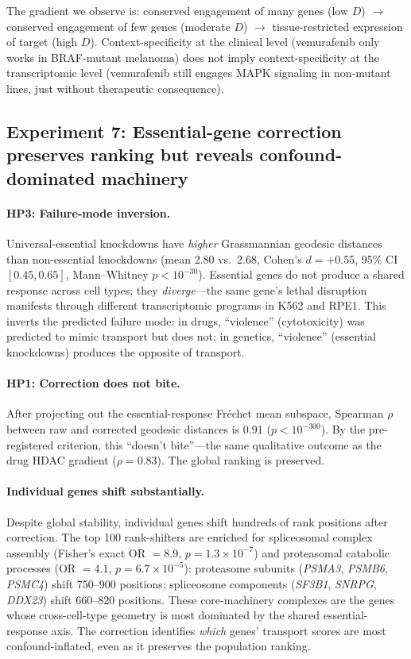 \documentclass{article}
\begin{document}
The gradient we observe is: conserved engagement of many genes (low $D$)
$\to$ conserved engagement of few genes (moderate $D$) $\to$ tissue-restricted
expression of target (high $D$). Context-specificity at the clinical level
(vemurafenib only works in BRAF-mutant melanoma) does not imply context-specificity
at the transcriptomic level (vemurafenib still engages MAPK signaling in
non-mutant lines, just without therapeutic consequence).

\subsection{Experiment 7: Essential-gene correction preserves ranking but reveals confound-dominated machinery}

\paragraph{HP3: Failure-mode inversion.}
Universal-essential knockdowns have \emph{higher} Grassmannian geodesic
distances than non-essential knockdowns (mean 2.80 vs.\ 2.68, Cohen's $d =
+0.55$, 95\% CI $[0.45, 0.65]$, Mann--Whitney $p < 10^{-30}$). Essential
genes do not produce a shared response across cell types; they
\emph{diverge}---the same gene's lethal disruption manifests through
different transcriptomic programs in K562 and RPE1. This inverts the
predicted failure mode: in drugs, ``violence'' (cytotoxicity) was predicted
to mimic transport but does not; in genetics, ``violence'' (essential
knockdowns) produces the opposite of transport.

\paragraph{HP1: Correction does not bite.}
After projecting out the essential-response Fr\'echet mean subspace,
Spearman $\rho$ between raw and corrected geodesic distances is 0.91 ($p <
10^{-300}$). By the pre-registered criterion, this ``doesn't bite''---the
same qualitative outcome as the drug HDAC gradient ($\rho = 0.83$).
The global ranking is preserved.

\paragraph{Individual genes shift substantially.}
Despite global stability, individual genes shift hundreds of rank positions
after correction. The top 100 rank-shifters are enriched for spliceosomal
complex assembly (Fisher's exact OR $= 8.9$, $p = 1.3 \times 10^{-7}$) and
proteasomal catabolic processes (OR $= 4.1$, $p = 6.7 \times 10^{-5}$):
proteasome subunits (\emph{PSMA3}, \emph{PSMB6}, \emph{PSMC4}) shift
750--900 positions; spliceosome components (\emph{SF3B1}, \emph{SNRPG},
\emph{DDX23}) shift 660--820 positions. These core-machinery complexes are
the genes whose cross-cell-type geometry is most dominated by the shared
essential-response axis. The correction identifies \emph{which} genes'
transport scores are most confound-inflated, even as it preserves the
population ranking.
\end{document}
